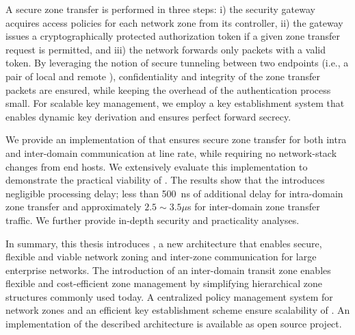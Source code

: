 A secure zone transfer is performed in three steps: i) the security gateway
acquires access policies for each network zone from its controller, ii) the
gateway issues a cryptographically protected authorization token if a given zone
transfer request is permitted, and iii) the network forwards only packets with a
valid token. By leveraging the notion of secure tunneling between two endpoints
(i.e., a pair of local and remote \tps), confidentiality and integrity of the
zone transfer packets are ensured, while keeping the overhead of the
authentication process small. For scalable key management, we employ a key
establishment system that enables dynamic key derivation and ensures perfect
forward secrecy.

We provide an implementation of \name that ensures secure zone transfer for
both intra and inter-domain communication at line rate, while requiring no network-stack
changes from end hosts. We extensively evaluate this implementation to demonstrate
the practical viability of \name. The results show that the \tp introduces negligible
processing delay; less than \SI{500}{ns} of additional delay for intra-domain zone transfer
and approximately $2.5 \sim 3.5 \mu$s for inter-domain zone transfer traffic. We further
provide in-depth security and practicality analyses.


In summary, this thesis introduces \name, a new architecture that enables secure, flexible
and viable network zoning and inter-zone communication for large enterprise
networks. The introduction of an inter-domain transit zone enables flexible and
cost-efficient zone management by simplifying hierarchical zone structures commonly used
today. A centralized policy management system  for network zones and an efficient key establishment
scheme ensure scalability of \name. An implementation of the described
architecture is available as open source project.


